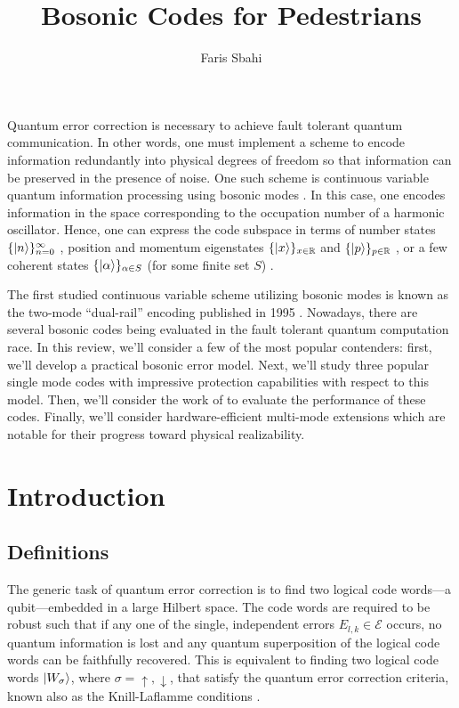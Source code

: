 \documentclass[12]{amsart}
\title{Bosonic Codes for Pedestrians}
\author{Faris Sbahi}
\newcommand\0{\mathbf{0}}
\newcommand\RR{\mathbb{R}}
\newcommand\<{\langle}
\renewcommand\>{\rangle}
\begin{document}
\maketitle

Quantum error correction is necessary to achieve fault tolerant quantum communication. In other words, one must implement a scheme to encode information redundantly into physical degrees of freedom so that information can be preserved in the presence of noise. One such scheme is continuous variable quantum information processing using bosonic modes \cite{braunstein1998error, braunstein2005quantum, niset2008experimentally, aoki2009quantum, lloyd1998analog, lassen2010quantum}. In this case, one encodes information in the space corresponding to the occupation number of a harmonic oscillator. Hence, one can express the code subspace in terms of number states $\{\ket{n}\}^\infty_{n=0}$ \cite{michael2016new}, position and momentum eigenstates $\{\ket{x}\}_{x\in\RR}$ and $\{\ket{p}\}_{p\in\RR}$  \cite{gottesman2001encoding}, or a few coherent states $\{\ket{\alpha}\}_{\alpha\in S}$ (for some finite set $S$) \cite{cochrane1999macroscopically}.

The first studied continuous variable scheme utilizing bosonic modes is known as the two-mode “dual-rail” encoding published in 1995 \cite{chuang1995simple}. Nowadays, there are several bosonic codes being evaluated in the fault tolerant quantum computation race. In this review, we'll consider a few of the most popular contenders: first, we'll develop a practical bosonic error model. Next, we'll study three popular single mode codes with impressive protection capabilities with respect to this model. Then, we'll consider the work of \cite{albert2017performance} to evaluate the performance of these codes. Finally, we'll consider hardware-efficient multi-mode extensions which are notable for their progress toward physical realizability.

\section{Introduction}

\subsection{Definitions}

The generic task of quantum error correction is to find two logical code words---a qubit---embedded in a large Hilbert space. The code words are required to be robust such that if any one of the single, independent errors $E_{l,k} \in \mathcal{E}$ occurs, no quantum information is lost and any quantum superposition of the logical code words can be faithfully recovered. This is equivalent to finding two logical code words $\ket{W_\sigma}$, where $\sigma = \uparrow, \downarrow$, that satisfy the quantum error correction criteria, known also as the Knill-Laflamme conditions \cite{nielsen2002quantum}.
\end{document}

